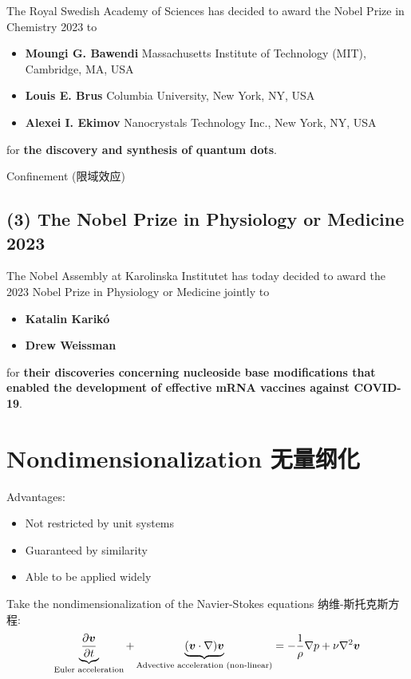The Royal Swedish Academy of Sciences has decided to award the Nobel
Prize in Chemistry 2023 to

\begin{itemize}
\tightlist{}
\item
  \textbf{Moungi G. Bawendi} Massachusetts Institute of Technology
  (MIT), Cambridge, MA, USA
\item
  \textbf{Louis E. Brus} Columbia University, New York, NY, USA
\item
  \textbf{Alexei I. Ekimov} Nanocrystals Technology Inc., New York, NY,
  USA
\end{itemize}

for \textbf{the discovery and synthesis of quantum dots}.

Confinement (限域效应)

\subsection*{(3) The Nobel Prize in Physiology or Medicine
2023}\label{the-nobel-prize-in-physiology-or-medicine-2023}

The Nobel Assembly at Karolinska Institutet has today decided to award
the 2023 Nobel Prize in Physiology or Medicine jointly to

\begin{itemize}
\tightlist{}
\item
  \textbf{Katalin Karikó}
\item
  \textbf{Drew Weissman}
\end{itemize}

for \textbf{their discoveries concerning nucleoside base modifications
that enabled the development of effective mRNA vaccines against
COVID-19}.

\section{Nondimensionalization
无量纲化}\label{nondimensionalization-ux65e0ux91cfux7eb2ux5316}

Advantages:
\begin{itemize}
\tightlist{}
\item Not restricted by unit systems
\item Guaranteed by similarity
\item Able to be applied widely
\end{itemize}

Take the nondimensionalization of the Navier-Stokes equations
纳维-斯托克斯方程:
\[ \underbrace{\partial \boldsymbol v \over \partial t}_{\text{Euler acceleration}} +\underbrace{(\boldsymbol v \cdot \nabla) \boldsymbol v}_{\text{Advective acceleration (non-linear)}} = -{1 \over \rho} \nabla p + \nu \nabla^2 \boldsymbol v\]

